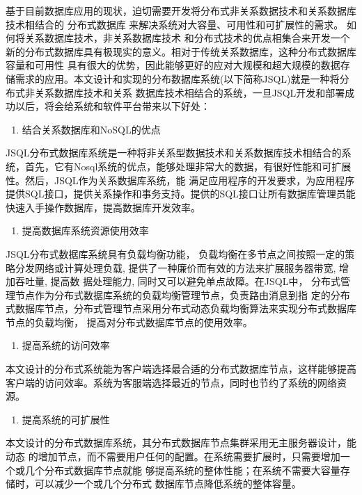 基于目前数据库应用的现状，迫切需要开发将分布式非关系数据技术和关系数据库技术相结合的
分布式数据库
来解决系统对大容量、可用性和可扩展性的需求。
如何将关系数据库技术，非关系数据库技术
和分布式技术的优点相集合来开发一个新的分布式数据库具有极现实的意义。相对于传统关系数据库，这种分布式数据库容量和可用性
具有很大的优势，因此能够更好的应对大规模和超大规模的数据存储需求的应用。本文设计和实现的分布数据库系统(以下简称JSQL)就是一种将分布式非关系数据库技术和关系
数据库技术相结合的系统，一旦JSQL开发和部署成功以后，将会给系统和软件平台带来以下好处：

\begin{enumerate}
	\item 结合关系数据库和NoSQL的优点
\end{enumerate}

	JSQL分布式数据库系统是一种将非关系型数据技术和关系数据库技术相结合的系统，首先，它有Nosql系统的优点，能够处理非常大的数据，有很好性能和可扩展性。然后，JSQL作为关系数据库系统，能
	满足应用程序的开发要求，为应用程序提供SQL接口，提供关系操作和事务支持。提供的SQL接口让所有数据库管理员能快速入手操作数据库，提高数据库开发效率。
	
	\begin{enumerate}[resume]
		\item 提高数据库系统资源使用效率
	\end{enumerate}

	JSQL分布式数据库系统具有负载均衡功能，
	负载均衡在多节点之间按照一定的策略分发网络或计算处理负载,
	提供了一种廉价而有效的方法来扩展服务器带宽, 增加吞吐量, 提高数
	据处理能力, 同时又可以避免单点故障。在JSQL中，
	分布式管理节点作为分布式数据库系统的负载均衡管理节点，负责路由消息到指
	定的分布式数据库节点，分布式管理节点采用分布式动态负载均衡算法来实现分布式数据库节点的负载均衡，
	提高对分布式数据库节点的使用效率。
	
	\begin{enumerate}[resume]
		\item 提高系统的访问效率
	\end{enumerate}

	本文设计的分布式系统能为客户端选择最合适的分布式数据库节点，这样能够提高客户端的访问效率。系统为客服端选择最近的节点，同时也节约了系统的网络资源。
	
	\begin{enumerate}[resume]
		\item 提高系统的可扩展性
	\end{enumerate}

	本文设计的分布式数据库系统，其分布式数据库节点集群采用无主服务器设计，能动态
	的增加节点，而不需要用户任何的配置。在系统需要扩展时，只需要增加一个或几个分布式数据库节点就能
	够提高系统的整体性能；在系统不需要大容量存储时，可以减少一个或几个分布式
	数据库节点降低系统的整体容量。
	

